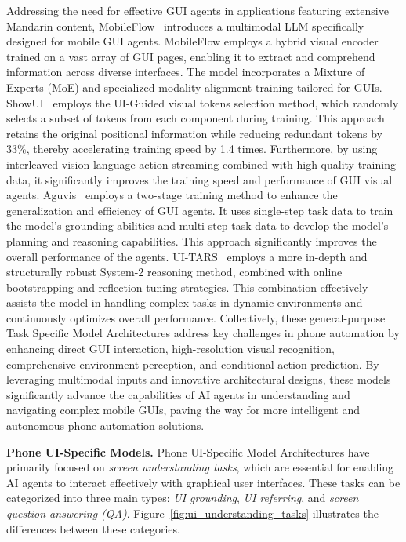 Addressing the need for effective GUI agents in applications featuring extensive Mandarin content, MobileFlow~\cite{nong2024mobileflow} introduces a multimodal LLM specifically designed for mobile GUI agents. MobileFlow employs a hybrid visual encoder trained on a vast array of GUI pages, enabling it to extract and comprehend information across diverse interfaces. The model incorporates a Mixture of Experts (MoE) and specialized modality alignment training tailored for GUIs.
ShowUI~\cite{lin2024showui} employs the UI-Guided visual tokens selection method, which randomly selects a subset of tokens from each component during training. This approach retains the original positional information while reducing redundant tokens by 33\%, thereby accelerating training speed by 1.4 times. Furthermore, by using interleaved vision-language-action streaming combined with high-quality training data, it significantly improves the training speed and performance of GUI visual agents. Aguvis~\cite{xu2024aguvis} employs a two-stage training method to enhance the generalization and efficiency of GUI agents. It uses single-step task data to train the model's grounding abilities and multi-step task data to develop the model's planning and reasoning capabilities. This approach significantly improves the overall performance of the agents.
UI-TARS~\cite{qin2025ui} employs a more in-depth and structurally robust System-2 reasoning method, combined with online bootstrapping and reflection tuning strategies. This combination effectively assists the model in handling complex tasks in dynamic environments and continuously optimizes overall performance.
Collectively, these general-purpose Task Specific Model Architectures address key challenges in phone automation by enhancing direct GUI interaction, high-resolution visual recognition, comprehensive environment perception, and conditional action prediction. By leveraging multimodal inputs and innovative architectural designs, these models significantly advance the capabilities of AI agents in understanding and navigating complex mobile GUIs, paving the way for more intelligent and autonomous phone automation solutions.


\noindent\textbf{Phone UI-Specific Models.}
Phone UI-Specific Model Architectures have primarily focused on \textit{screen understanding tasks}, which are essential for enabling AI agents to interact effectively with graphical user interfaces. These tasks can be categorized into three main types: \textit{UI grounding}, \textit{UI referring}, and \textit{screen question answering (QA)}. Figure~\ref{fig:ui_understanding_tasks} illustrates the differences between these categories.

